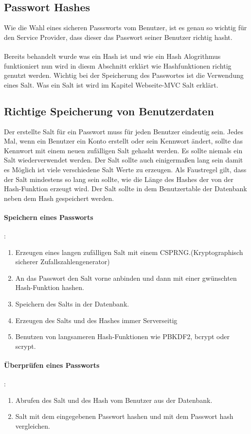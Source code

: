 {\subsection{Passwort Hashes}
\label{sec:pwdhash}
Wie die Wahl eines sicheren Passsworts vom Benutzer, ist es genau so wichtig für den Service Provider, dass dieser das Passwort seiner Benutzer richtig hasht.\\ \\Bereits behandelt wurde was ein Hash ist und wie ein Hash Alogrithmus funktioniert nun wird in diesm Abschnitt erklärt wie Hashfunktionen richtig genutzt werden. Wichtig bei der Speicherung des Passwortes ist die Verwendung eines Salt. Was ein Salt ist wird im Kapitel Webseite-MVC Salt erklärt.
\subsection{Richtige Speicherung von Benutzerdaten}
Der erstellte Salt für ein Passwort muss für jeden Benutzer eindeutig sein. Jedes Mal, wenn ein Benutzer ein Konto erstellt oder sein Kennwort ändert, sollte das Kennwort mit einem neuen zufälligen Salt gehasht werden. Es sollte niemals ein Salt wiederverwendet werden. Der Salt sollte auch einigermaßen lang sein damit es Möglich ist viele verschiedene Salt Werte zu erzeugen. Als Faustregel gilt, dass der Salt mindestens so lang sein sollte, wie die Länge des Hashes der von der Hash-Funktion erzeugt wird. Der Salt sollte in dem Benutzertable der Datenbank neben dem Hash gespeichert werden.
\paragraph{Speichern eines Passworts}:\\
\begin{enumerate}
\item Erzeugen eines langen zufälligen Salt mit einem CSPRNG.(Kryptographisch sicherer Zufallszahlengenerator) 
\item An das Passwort den Salt vorne anbinden und dann mit einer gwünschten Hash-Funktion hashen.
\item Speichern des Salts in der Datenbank.
\item Erzeugen des Salts und des Hashes immer Serverseitig
\item Benutzen von langsameren Hash-Funktionen wie  PBKDF2, bcrypt oder scrypt.
\end{enumerate}
\paragraph{Überprüfen eines Passworts}:\\
\begin{enumerate}
\item Abrufen des Salt und des Hash vom Benutzer aus der Datenbank.
\item Salt mit dem eingegebenen Passwort hashen und mit dem Passwort hash vergleichen.
\end{enumerate}
}
